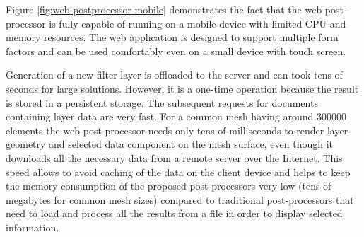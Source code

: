Figure \ref{fig:web-postprocessor-mobile} demonstrates the fact that the web post-processor is fully capable of running on a mobile device with limited CPU and memory resources. The web application is designed to support multiple form factors and can be used comfortably even on a small device with touch screen.

Generation of a new filter layer is offloaded to the server and can took tens of seconds for large solutions. However, it is a one-time operation because the result is stored in a persistent storage. The subsequent requests for documents containing layer data are very fast. For a common mesh having around 300000 elements the web post-processor needs only tens of milliseconds to render layer geometry and selected data component on the mesh surface, even though it downloads all the necessary data from a remote server over the Internet. This speed allows to avoid caching of the data on the client device and helps to keep the memory consumption of the proposed post-processors very low (tens of megabytes for common mesh sizes) compared to traditional post-processors that need to load and process all the results from a file in order to display selected information.
